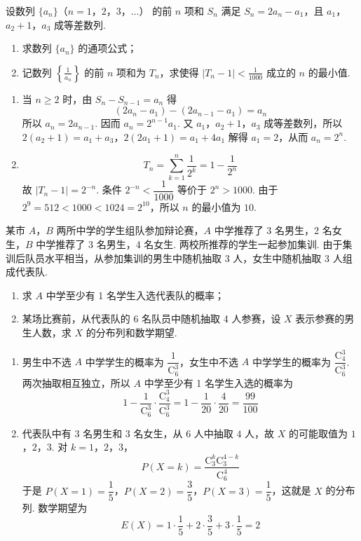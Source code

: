 \begin{problem}
设数列 \(\{a_{n}\}\)（\(n = 1\)，\(2\)，\(3\)，\(\dots\)） 的前 \(n\) 项和 \(S_{n}\) 满足 \(S_{n} = 2a_{n} - a_{1}\)，且 \(a_1\)，\(a_2 + 1\)，\(a_3\) 成等差数列.
\begin{enumerate}
\item 求数列 \( \{a_{n}\} \) 的通项公式；
\item 记数列 \( \left\{\frac{1}{a_{n}}\right\} \) 的前 \(n\) 项和为 \( T_{n} \)，求使得 \( \left|T_{n} - 1\right| < \frac{1}{1000} \) 成立的 \(n\) 的最小值.
\end{enumerate}
\begin{solution}
\begin{enumerate}
\item 当 \(n\geqslant2\) 时，由 \(S_n-S_{n-1}=a_n\) 得
\[
(2a_n-a_1)-(2a_{n-1}-a_1)=a_n
\]
所以 \(a_n=2a_{n-1}\). 因而 \(a_n=2^{n-1}a_1\). 又 \(a_1\)，\(a_2+1\)，\(a_3\) 成等差数列，所以
\(2(a_2+1)=a_1+a_3\)，\(2(2a_1+1)=a_1+4a_1\)
解得 \(a_1=2\)，从而 \(a_n=2^n\).
\item
\[
T_n=\sum_{k=1}^{n}\frac1{2^k}=1-\frac1{2^n}
\]
故 \(\lvert T_n-1\rvert=2^{-n}\). 条件 \(2^{-n}<\dfrac1{1000}\) 等价于 \(2^n>1000\). 由于 \(2^9=512<1000<1024=2^{10}\)，所以 \(n\) 的最小值为 \(10\).
\end{enumerate}
\end{solution}
\end{problem}

\begin{problem}
某市 \(A\)，\(B\) 两所中学的学生组队参加辩论赛，\(A\) 中学推荐了 3 名男生，2 名女生，\(B\) 中学推荐了 3 名男生，4 名女生. 两校所推荐的学生一起参加集训. 由于集训后队员水平相当，从参加集训的男生中随机抽取 3 人，女生中随机抽取 3 人组成代表队.
\begin{enumerate}
\item 求 \(A\) 中学至少有 1 名学生入选代表队的概率；
\item 某场比赛前，从代表队的 6 名队员中随机抽取 4 人参赛，设 \(X\) 表示参赛的男生人数，求 \(X\) 的分布列和数学期望.
\end{enumerate}
\begin{solution}
\begin{enumerate}
\item 男生中不选 \(A\) 中学学生的概率为 \(\dfrac1{\mathrm C_6^3}\)，女生中不选 \(A\) 中学学生的概率为 \(\dfrac{\mathrm C_4^3}{\mathrm C_6^3}\). 两次抽取相互独立，所以 \(A\) 中学至少有 1 名学生入选的概率为
\[
1-\frac1{\mathrm C_6^3}\cdot\frac{\mathrm C_4^3}{\mathrm C_6^3}=1-\frac1{20}\cdot\frac4{20}=\frac{99}{100}
\]
\item 代表队中有 \(3\) 名男生和 \(3\) 名女生，从 \(6\) 人中抽取 \(4\) 人，故 \(X\) 的可能取值为 \(1\)，\(2\)，\(3\). 对 \(k=1\)，\(2\)，\(3\)，
\[
P(X=k)=\frac{\mathrm C_3^k\mathrm C_3^{4-k}}{\mathrm C_6^4}
\]
于是 \(P(X=1)=\dfrac15\)，\(P(X=2)=\dfrac35\)，\(P(X=3)=\dfrac15\)，这就是 \(X\) 的分布列. 数学期望为
\[
E(X)=1\cdot\frac15+2\cdot\frac35+3\cdot\frac15=2
\]
\end{enumerate}
\end{solution}
\end{problem}

